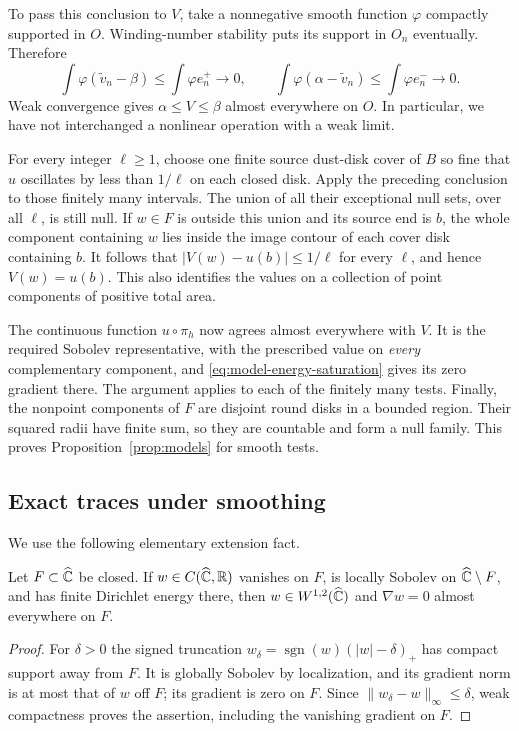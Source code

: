 To pass this conclusion to $V$, take a nonnegative smooth function
$\varphi$ compactly supported in $O$.  Winding-number stability puts
its support in $O_n$ eventually.  Therefore
\[
 \int\varphi(\widetilde v_n-\beta)\le\int\varphi e_n^+\longrightarrow0,
 \qquad
 \int\varphi(\alpha-\widetilde v_n)\le\int\varphi e_n^-\longrightarrow0.
\]
Weak convergence gives $\alpha\le V\le\beta$ almost everywhere on
$O$.  In particular, we have not interchanged a nonlinear operation
with a weak limit.

For every integer $\ell\ge1$, choose one finite source dust-disk
cover of $B$ so fine that $u$ oscillates by less than $1/\ell$ on each
closed disk.  Apply the preceding conclusion to those finitely many
intervals.  The union of all their exceptional null sets, over all
$\ell$, is still null.  If $w\in F$ is outside this union and its
source end is $b$, the whole component containing $w$ lies inside
the image contour of each cover disk containing $b$.  It follows that
$|V(w)-u(b)|\le1/\ell$ for every $\ell$, and hence $V(w)=u(b)$.
This also identifies the values on a collection of point components
of positive total area.

The continuous function $u\circ\pi_h$ now agrees almost everywhere
with $V$.  It is the required Sobolev representative, with the
prescribed value on \emph{every} complementary component, and
\eqref{eq:model-energy-saturation} gives its zero gradient there.
The argument applies to each of the finitely many tests.  Finally,
the nonpoint components of $F$ are disjoint round disks in a bounded
region.  Their squared radii have finite sum, so they are countable
and form a null family.  This proves Proposition~\ref{prop:models}
for smooth tests.

\subsection{Exact traces under smoothing}

We use the following elementary extension fact.
\begin{lemma}\label{lem:zero-trace-extension}
Let $F\subset\widehat{\mathbb C}$ be closed.  If $w\in C(\widehat{\mathbb C},\mathbb R)$ vanishes on $F$,
is locally Sobolev on $\widehat{\mathbb C}\setminus F$, and has finite Dirichlet
energy there, then $w\in W^{1,2}(\widehat{\mathbb C})$ and
$\nabla w=0$ almost everywhere on $F$.
\end{lemma}
\begin{proof}
For $\delta>0$ the signed truncation
$w_\delta=\operatorname{sgn}(w)(|w|-\delta)_+$ has compact support
away from $F$.  It is globally Sobolev by localization, and its
gradient norm is at most that of $w$ off $F$; its gradient is zero
on $F$.  Since $\|w_\delta-w\|_\infty\le\delta$, weak compactness
proves the assertion, including the vanishing gradient on $F$.
\end{proof}

